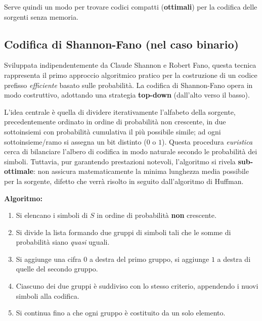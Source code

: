 Serve quindi un modo per trovare codici compatti (\textbf{ottimali}) per la codifica delle sorgenti senza memoria.

\subsection{Codifica di Shannon-Fano (nel caso binario)}
Sviluppata indipendentemente da Claude Shannon e Robert Fano, questa tecnica rappresenta il primo approccio algoritmico pratico per la costruzione di un codice prefisso \textit{efficiente} basato sulle probabilità. La codifica di Shannon-Fano opera in modo costruttivo, adottando una strategia \textbf{top-down} (dall'alto verso il basso).

L'idea centrale è quella di dividere iterativamente l'alfabeto della sorgente, precedentemente ordinato in ordine di probabilità non crescente, in due sottoinsiemi con probabilità cumulativa il più possibile simile; ad ogni sottoinsieme/ramo  si assegna un bit distinto ($0$ o $1$). Questa procedura \textit{euristica} cerca di bilanciare l'albero di codifica in modo naturale secondo le probabilità dei simboli. Tuttavia, pur garantendo prestazioni notevoli, l'algoritmo si rivela \textbf{sub-ottimale}: non assicura matematicamente la minima lunghezza media possibile per la sorgente, difetto che verrà risolto in seguito dall'algoritmo di Huffman.

\textbf{Algoritmo:}
\begin{enumerate}[label=\arabic*., leftmargin=1.5em]
  \item Si elencano i simboli di $S$ in ordine di probabilità \textbf{non} crescente.
  \item Si divide la lista formando due gruppi di simboli tali che le somme di probabilità siano \textit{quasi} uguali.
  \item Si aggiunge una cifra $0$ a destra del primo gruppo, si aggiunge $1$ a destra di quelle del secondo gruppo.
  \item Ciascuno dei due gruppi è suddiviso con lo stesso criterio, appendendo i nuovi simboli alla codifica.
  \item Si continua fino a che ogni gruppo è costituito da un solo elemento.
\end{enumerate}


